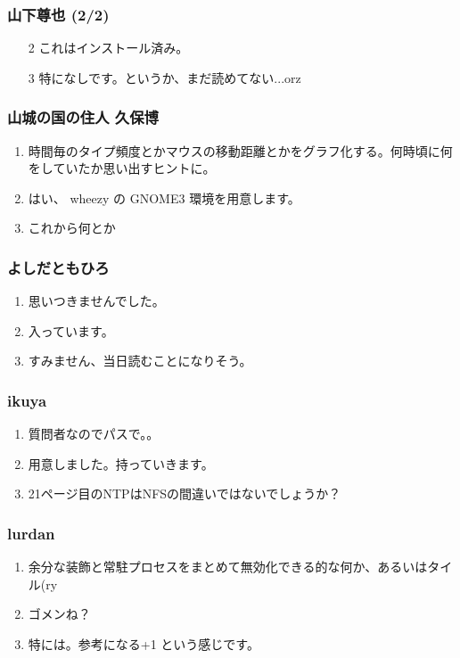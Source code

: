 \documentclass[cjk,dvipdfmx,10pt,compress,%
hyperref={bookmarks=true,bookmarksnumbered=true,bookmarksopen=false,%
colorlinks=false,%
pdftitle={第 70 回 関西 Debian 勉強会},%
pdfauthor={倉敷・のがた・佐々木・かわだ・八津尾},%
pdfsubject={資料},%
}]{beamer}
\begin{document}
\begin{frame}
  \frametitle{山下尊也 (2/2)}
  \begin{enumerate}
  \item[2] これはインストール済み。
  \item[3] 特になしです。というか、まだ読めてない...orz 
  \end{enumerate}
\end{frame}

\begin{frame}
  \frametitle{山城の国の住人 久保博 }
  \begin{enumerate}
  \item 時間毎のタイプ頻度とかマウスの移動距離とかをグラフ化する。何時頃に何をしていたか思い出すヒントに。
  \item はい、 wheezy の GNOME3 環境を用意します。
  \item これから何とか
  \end{enumerate}
\end{frame}

\begin{frame}
  \frametitle{よしだともひろ}
  \begin{enumerate}
  \item 思いつきませんでした。
  \item 入っています。
  \item すみません、当日読むことになりそう。
  \end{enumerate}
\end{frame}

\begin{frame}
  \frametitle{ikuya}
  \begin{enumerate}
  \item 質問者なのでパスで。。
  \item 用意しました。持っていきます。
  \item 21ページ目のNTPはNFSの間違いではないでしょうか？
  \end{enumerate}
\end{frame}

\begin{frame}
  \frametitle{lurdan}
  \begin{enumerate}
  \item 余分な装飾と常駐プロセスをまとめて無効化できる的な何か、あるいはタイル(ry
  \item ゴメンね？
  \item 特には。参考になる+1 という感じです。
  \end{enumerate}
\end{frame}
\end{document}

